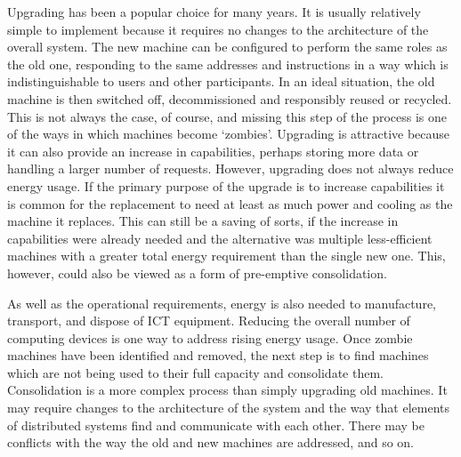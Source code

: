 Upgrading has been a popular choice for many years. It is usually relatively simple to implement because it requires no changes to the architecture of the overall system. The new machine can be configured to perform the same roles as the old one, responding to the same addresses and instructions in a way which is indistinguishable to users and other participants. In an ideal situation, the old machine is then switched off, decommissioned and responsibly reused or recycled. This is not always the case, of course, and missing this step of the process is one of the ways in which machines become `\gls{zombie}s'. Upgrading is attractive because it can also provide an increase in capabilities, perhaps storing more data or handling a larger number of requests. However, upgrading does not always reduce energy usage. If the primary purpose of the upgrade is to increase capabilities it is common for the replacement to need at least as much power and cooling as the machine it replaces. This can still be a saving of sorts, if the increase in capabilities were already needed and the alternative was multiple less-efficient machines with a greater total energy requirement than the single new one. This, however, could also be viewed as a form of pre-emptive consolidation.

As well as the operational requirements, energy is also needed to manufacture, transport, and dispose of ICT equipment. Reducing the overall number of computing devices is one way to address rising energy usage. Once zombie machines have been identified and removed, the next step is to find machines which are not being used to their full capacity and consolidate them. Consolidation is a more complex process than simply upgrading old machines. It may require changes to the architecture of the system and the way that elements of distributed systems find and communicate with each other. There may be conflicts with the way the old and new machines are addressed, and so on.

